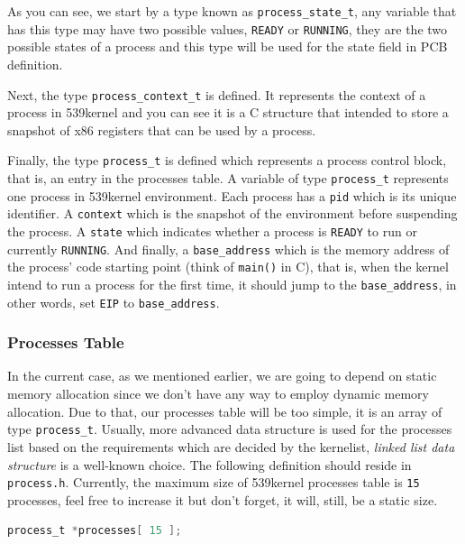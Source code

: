 As you can see, we start by a type known as \lstinline!process_state_t!,
any variable that has this type may have two possible values,
\lstinline!READY! or \lstinline!RUNNING!, they are the two possible
states of a process and this type will be used for the state field in
PCB definition.

Next, the type \lstinline!process_context_t! is defined. It represents
the context of a process in 539kernel and you can see it is a C
structure that intended to store a snapshot of x86 registers that can be
used by a process.

Finally, the type \lstinline!process_t! is defined which represents a
process control block, that is, an entry in the processes table. A
variable of type \lstinline!process_t! represents one process in
539kernel environment. Each process has a \lstinline!pid! which is its
unique identifier. A \lstinline!context! which is the snapshot of the
environment before suspending the process. A \lstinline!state! which
indicates whether a process is \lstinline!READY! to run or currently
\lstinline!RUNNING!. And finally, a \lstinline!base_address! which is
the memory address of the process' code starting point (think of
\lstinline!main()! in C), that is, when the kernel intend to run a
process for the first time, it should jump to the
\lstinline!base_address!, in other words, set \lstinline!EIP! to
\lstinline!base_address!.

\subsubsection{Processes Table}\label{processes-table}

In the current case, as we mentioned earlier, we are going to depend on
static memory allocation since we don't have any way to employ dynamic
memory allocation. Due to that, our processes table will be too simple,
it is an array of type \lstinline!process_t!. Usually, more advanced
data structure is used for the processes list based on the requirements
which are decided by the kernelist, \emph{linked list data structure} is
a well-known choice. The following definition should reside in
\lstinline!process.h!. Currently, the maximum size of 539kernel
processes table is \lstinline!15! processes, feel free to increase it
but don't forget, it will, still, be a static size.

\begin{lstlisting}[language=C]
process_t *processes[ 15 ];
\end{lstlisting}

